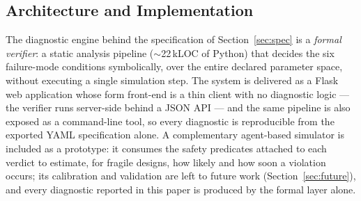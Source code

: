 
\subsection{Architecture and Implementation}
\label{sec:architecture}

The diagnostic engine behind the specification of
Section~\ref{sec:spec} is a \emph{formal verifier}: a static analysis
pipeline ($\sim$22\,kLOC of Python) that decides the six failure-mode
conditions symbolically, over the entire declared parameter space,
without executing a single simulation step. The system is delivered as
a Flask web application whose form front-end is a thin client with no
diagnostic logic --- the verifier runs server-side behind a JSON API
--- and the same pipeline is also exposed as a command-line tool, so
every diagnostic is reproducible from the exported YAML specification
alone. A complementary
agent-based simulator is included as a prototype: it consumes the
safety predicates attached to each verdict to estimate, for
\textsf{fragile} designs, how likely and how soon a violation occurs;
its calibration and validation are left to future work
(Section~\ref{sec:future}), and every diagnostic reported in this
paper is produced by the formal layer alone.

